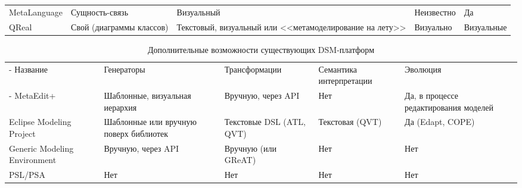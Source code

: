\begin{table}[ht]
\begin{small}
\begin{longtabu} {| X[1 l p] | X[1 l p] | X[1 l p] | X[1 l p] |X[1 l p] |}
		MetaLanguage                 & Сущность-связь                  & Визуальный                                              & Неизвестно                                               & Да                                             \\
		 QReal  & Свой (диаграммы классов)        & Текстовый, визуальный или <<метамоделирование на лету>> & Визуально                                                & Визуальные                                     
		\label{tab:existingPlatformsMain}
	\end{longtabu}
\end{small}
\end{table}

\begin{table}[ht]
\begin{small}
	\begin{longtabu} {| X[1 l p] | X[1 l p] | X[1 l p] | X[1 l p] | X[1 l p] |}
		\caption{Дополнительные возможности существующих DSM-платформ} \\
		\tabucline-
		 Название                    & Генераторы                                    & Трансформации                                  & Семантика интерпретации                             & Эволюция                                                                   \\
		\tabucline-
		\everyrow{\tabucline-}
		MetaEdit+                    & Шаблонные, визуальная иерархия                & Вручную, через API                             & Нет                                                 & Да, в процессе редактирования моделей                                      \\
		Eclipse Modeling Project     & Шаблонные или вручную поверх библиотек        & Текстовые DSL (ATL, QVT)                       & Текстовая (QVT)                                     & Да (Edapt, COPE)                                                           \\
		Generic Modeling Environment & Вручную, через API                            & Вручную (или GReAT)                            & Нет                                                 & Нет                                                                        \\
		PSL/PSA                      & Нет                                           & Нет                                            & Нет                                                 & Нет                                                                        \\

\end{longtabu}
\end{small}
\end{table}
